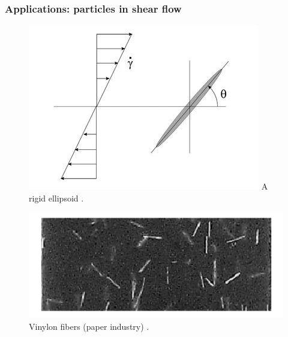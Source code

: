 \documentclass{beamer}
\begin{document}
\begin{frame}
	\frametitle{Applications: particles in shear flow}
	\begin{overlayarea}{\textwidth}{\textheight}
		\vspace{-0.2cm}
    	\begin{figure}
			\begin{minipage}{0.4\linewidth}
				\centering
				\includegraphics[width=\linewidth]{plots/application2.png} 
			 \centering \scriptsize A rigid ellipsoid \cite{yasuda2004experimental}.
			\end{minipage}
		\begin{minipage}{0.5\linewidth}
			\centering
			\includegraphics[width=\linewidth]{plots/application2_2.png} 
			\centering \scriptsize Vinylon fibers (paper industry) \cite{yasuda2004experimental}.
		\end{minipage}\vspace{0.5cm}
	\begin{minipage}{0.3\linewidth}
		\centering

\end{minipage}
\end{figure}
\end{overlayarea}
\end{frame}
\end{document}
